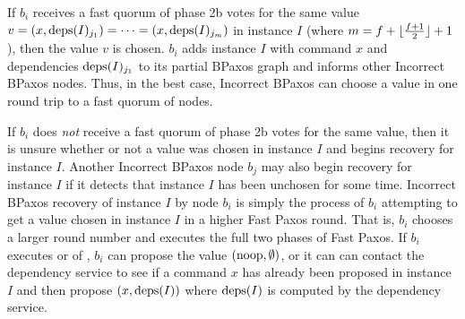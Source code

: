 If $b_i$ receives a fast quorum of phase 2b votes for the same value $v = (x,
\text{deps}(I)_{j_1}) = \cdots = (x, \text{deps}(I)_{j_m})$ in instance $I$ (where $m =
f + \lfloor\frac{f + 1}{2}\rfloor + 1$), then the value $v$ is chosen. $b_i$ adds instance $I$ with
command $x$ and dependencies $\text{deps}(I)_{j_1}$ to its partial BPaxos graph and
informs other Incorrect BPaxos nodes. Thus, in the best case, Incorrect BPaxos
can choose a value in one round trip to a fast quorum of nodes.

If $b_i$ does \emph{not} receive a fast quorum of phase 2b votes for the same
value, then it is unsure whether or not a value was chosen in instance $I$ and
begins recovery for instance $I$. Another Incorrect BPaxos node $b_j$ may also
begin recovery for instance $I$ if it detects that instance $I$ has been
unchosen for some time.
%
Incorrect BPaxos recovery of instance $I$ by node $b_i$ is simply the process
of $b_i$ attempting to get a value chosen in instance $I$ in a higher Fast
Paxos round. That is, $b_i$ chooses a larger round number and executes the full
two phases of Fast Paxos. If $b_i$ executes  or
 of , $b_i$ can propose the
value $(\text{noop}, \emptyset)$, or it can can contact the dependency service to see
if a command $x$ has already been proposed in instance $I$ and then propose
$(x, \text{deps}(I))$ where $\text{deps}(I)$ is computed by the dependency service.

